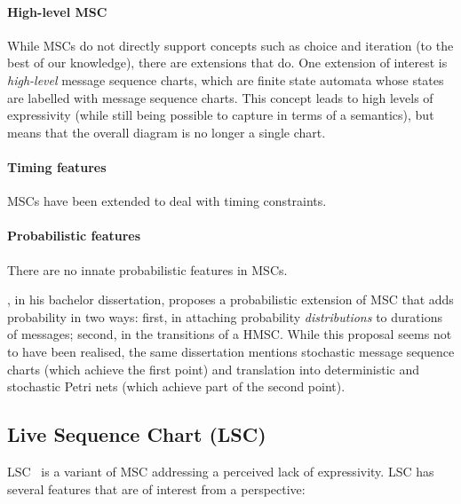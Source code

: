 \paragraph{High-level MSC}

While MSCs do not directly support concepts such as choice and iteration
(to the best of our knowledge), there are extensions that do.  One extension
of interest is \emph{high-level} message sequence charts, which are finite state
automata whose states are labelled with message sequence charts.  This concept
leads to high levels of expressivity (while still being possible to capture in
terms of a semantics), but means that the overall diagram is no longer a single
chart.

\paragraph{Timing features}
MSCs have been extended to deal with timing constraints.

\paragraph{Probabilistic features}
There are no innate probabilistic features in MSCs.

\textcite{Krivanek09-PMSC}, in his bachelor dissertation, proposes a
probabilistic extension of MSC that adds probability in two
ways: first, in attaching probability \emph{distributions} to
durations of messages; second, in the transitions of a HMSC.  While
this proposal seems not to have been realised, the same
dissertation mentions stochastic message sequence charts (which
achieve the first point) and translation into deterministic and
stochastic Petri nets (which achieve part of the second point).

\subsection{Live Sequence Chart (LSC)}

LSC~\cite{lsc} is a
variant of MSC addressing a perceived lack of expressivity.
LSC has several features that are of interest from a \langname{} perspective:

